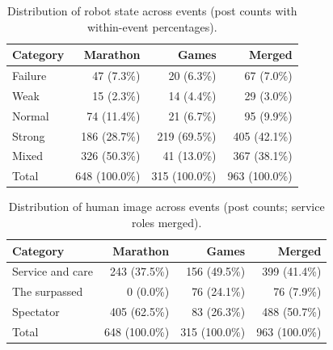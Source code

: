 \begin{table}[t]
  \centering
  \caption{Distribution of robot state across events (post counts with within-event percentages).}
  \label{tab:app-state-dist}
  \begin{tabular}{lrrr}
    \toprule
    Category & Marathon & Games & Merged \\
    \midrule
    Failure & 47 (7.3\%) & 20 (6.3\%) & 67 (7.0\%) \\
    Weak & 15 (2.3\%) & 14 (4.4\%) & 29 (3.0\%) \\
    Normal & 74 (11.4\%) & 21 (6.7\%) & 95 (9.9\%) \\
    Strong & 186 (28.7\%) & 219 (69.5\%) & 405 (42.1\%) \\
    Mixed & 326 (50.3\%) & 41 (13.0\%) & 367 (38.1\%) \\
    \midrule
    Total & 648 (100.0\%) & 315 (100.0\%) & 963 (100.0\%) \\
    \bottomrule
  \end{tabular}
\end{table}

\begin{table}[t]
  \centering
  \caption{Distribution of human image across events (post counts; service roles merged).}
  \label{tab:app-image-dist}
  \begin{tabular}{lrrr}
    \toprule
    Category & Marathon & Games & Merged \\
    \midrule
    Service and care & 243 (37.5\%) & 156 (49.5\%) & 399 (41.4\%) \\
    The surpassed & 0 (0.0\%) & 76 (24.1\%) & 76 (7.9\%) \\
    Spectator & 405 (62.5\%) & 83 (26.3\%) & 488 (50.7\%) \\
    \midrule
    Total & 648 (100.0\%) & 315 (100.0\%) & 963 (100.0\%) \\
    \bottomrule
  \end{tabular}
\end{table}

